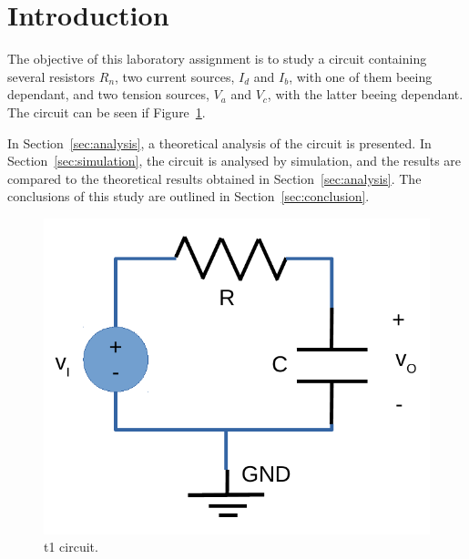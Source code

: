 \section{Introduction}
\label{sec:introduction}

The objective of this laboratory assignment is to study a circuit containing several resistors $R_n$, two current sources, $I_d$ and $I_b$, with one of them beeing dependant, and two tension sources, $V_a$ and $V_c$, with the latter beeing dependant. The circuit can be seen if Figure~\ref{fig:rc}.


In Section~\ref{sec:analysis}, a theoretical analysis of the circuit is
presented. In Section~\ref{sec:simulation}, the circuit is analysed by
simulation, and the results are compared to the theoretical results obtained in
Section~\ref{sec:analysis}. The conclusions of this study are outlined in
Section~\ref{sec:conclusion}.

\begin{figure}[h] \centering
\includegraphics[width=0.4\linewidth]{rc.pdf}
\caption{t1 circuit.}
\label{fig:rc}
\end{figure}


